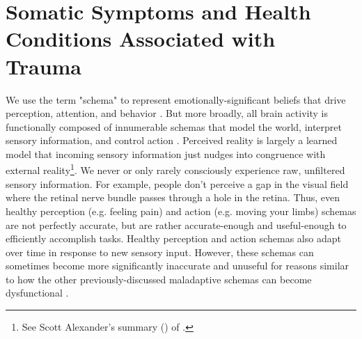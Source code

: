 \documentclass[12pt,letterpaper]{book}
\begin{document}
\section{Somatic Symptoms and Health Conditions Associated with Trauma}
\label{psychogenic}
We use the term "schema" to represent emotionally-significant beliefs that drive perception, attention, and behavior \cite{eckerUnlocking}. But more broadly, all brain activity is functionally composed of innumerable schemas that model the world, interpret sensory information, and control action \cite{clark2015surfing}. Perceived reality is largely a learned model that incoming sensory information just nudges into congruence with external reality\footnote{See Scott Alexander's summary (\textcite{alexanderSurfing}) of \textcite{clark2015surfing}.}. We never or only rarely consciously experience raw, unfiltered sensory information. For example, people don't perceive a gap in the visual field where the retinal nerve bundle passes through a hole in the retina. Thus, even healthy perception (e.g. feeling pain) and action (e.g. moving your limbs) schemas are not perfectly accurate, but are rather accurate-enough and useful-enough to efficiently accomplish tasks. Healthy perception and action schemas also adapt over time in response to new sensory input. However, these schemas can sometimes become more significantly inaccurate and unuseful for reasons similar to how the other previously-discussed maladaptive schemas can become dysfunctional \cite{berghPsychogenic}.
\end{document}
